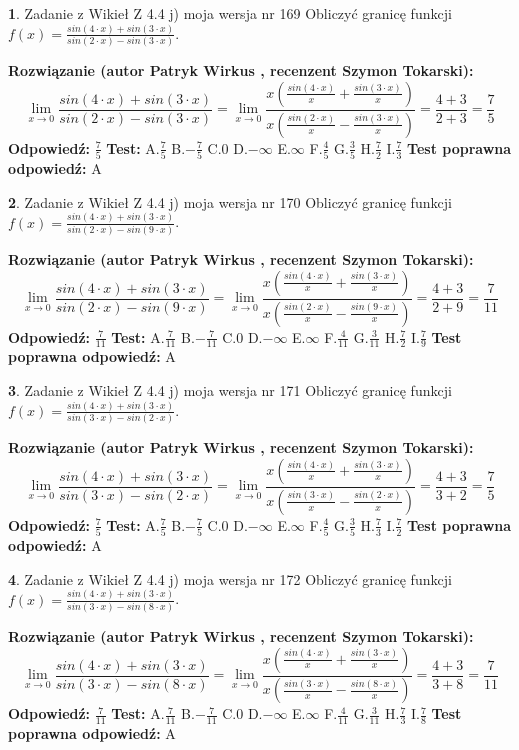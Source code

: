 \documentclass[12pt, a4paper]{article}
\theoremstyle{definition} %
\newtheorem{zad}{}
\newcommand{\zadStart}[1]{\begin{zad}#1\newline}
\newcommand{\zadStop}{\end{zad}}
\newcommand{\rozwStart}[2]{\noindent \textbf{Rozwiązanie (autor #1 , recenzent #2): }\newline}
\newcommand{\rozwStop}{\newline}
\newcommand{\odpStart}{\noindent \textbf{Odpowiedź:}\newline}
\newcommand{\odpStop}{\newline}
\newcommand{\testStart}{\noindent \textbf{Test:}\newline}
\newcommand{\testStop}{\newline}
\newcommand{\kluczStart}{\noindent \textbf{Test poprawna odpowiedź:}\newline}
\newcommand{\kluczStop}{\newline}
\begin{document}
\zadStart{Zadanie z Wikieł Z 4.4 j) moja wersja nr 169}
Obliczyć granicę funkcji $f(x)=\frac{sin(4\cdot x) +sin(3\cdot x)}{sin(2\cdot x) -sin(3\cdot x)}$.
\zadStop
\rozwStart{Patryk Wirkus}{Szymon Tokarski}
$$\lim\limits_{x\to 0}\frac{sin(4\cdot x) +sin(3\cdot x)}{sin(2\cdot x) -sin(3\cdot x)}=\lim\limits_{x\to 0}\frac{x(\frac{sin(4\cdot x)}{x}+\frac{sin(3\cdot x)}{x})}{x(\frac{sin(2\cdot x)}{x}-\frac{sin(3\cdot x)}{x})}=\frac{4+3}{2+3} = \frac{7}{5}$$
\rozwStop
\odpStart
$\frac{7}{5}$
\odpStop
\testStart
A.$\frac{7}{5}$
B.$-\frac{7}{5}$
C.$0$
D.$-\infty$
E.$\infty$
F.$\frac{4}{5}$
G.$\frac{3}{5}$
H.$\frac{7}{2}$
I.$\frac{7}{3}$
\testStop
\kluczStart
A
\kluczStop



\zadStart{Zadanie z Wikieł Z 4.4 j) moja wersja nr 170}
Obliczyć granicę funkcji $f(x)=\frac{sin(4\cdot x) +sin(3\cdot x)}{sin(2\cdot x) -sin(9\cdot x)}$.
\zadStop
\rozwStart{Patryk Wirkus}{Szymon Tokarski}
$$\lim\limits_{x\to 0}\frac{sin(4\cdot x) +sin(3\cdot x)}{sin(2\cdot x) -sin(9\cdot x)}=\lim\limits_{x\to 0}\frac{x(\frac{sin(4\cdot x)}{x}+\frac{sin(3\cdot x)}{x})}{x(\frac{sin(2\cdot x)}{x}-\frac{sin(9\cdot x)}{x})}=\frac{4+3}{2+9} = \frac{7}{11}$$
\rozwStop
\odpStart
$\frac{7}{11}$
\odpStop
\testStart
A.$\frac{7}{11}$
B.$-\frac{7}{11}$
C.$0$
D.$-\infty$
E.$\infty$
F.$\frac{4}{11}$
G.$\frac{3}{11}$
H.$\frac{7}{2}$
I.$\frac{7}{9}$
\testStop
\kluczStart
A
\kluczStop



\zadStart{Zadanie z Wikieł Z 4.4 j) moja wersja nr 171}
Obliczyć granicę funkcji $f(x)=\frac{sin(4\cdot x) +sin(3\cdot x)}{sin(3\cdot x) -sin(2\cdot x)}$.
\zadStop
\rozwStart{Patryk Wirkus}{Szymon Tokarski}
$$\lim\limits_{x\to 0}\frac{sin(4\cdot x) +sin(3\cdot x)}{sin(3\cdot x) -sin(2\cdot x)}=\lim\limits_{x\to 0}\frac{x(\frac{sin(4\cdot x)}{x}+\frac{sin(3\cdot x)}{x})}{x(\frac{sin(3\cdot x)}{x}-\frac{sin(2\cdot x)}{x})}=\frac{4+3}{3+2} = \frac{7}{5}$$
\rozwStop
\odpStart
$\frac{7}{5}$
\odpStop
\testStart
A.$\frac{7}{5}$
B.$-\frac{7}{5}$
C.$0$
D.$-\infty$
E.$\infty$
F.$\frac{4}{5}$
G.$\frac{3}{5}$
H.$\frac{7}{3}$
I.$\frac{7}{2}$
\testStop
\kluczStart
A
\kluczStop



\zadStart{Zadanie z Wikieł Z 4.4 j) moja wersja nr 172}
Obliczyć granicę funkcji $f(x)=\frac{sin(4\cdot x) +sin(3\cdot x)}{sin(3\cdot x) -sin(8\cdot x)}$.
\zadStop
\rozwStart{Patryk Wirkus}{Szymon Tokarski}
$$\lim\limits_{x\to 0}\frac{sin(4\cdot x) +sin(3\cdot x)}{sin(3\cdot x) -sin(8\cdot x)}=\lim\limits_{x\to 0}\frac{x(\frac{sin(4\cdot x)}{x}+\frac{sin(3\cdot x)}{x})}{x(\frac{sin(3\cdot x)}{x}-\frac{sin(8\cdot x)}{x})}=\frac{4+3}{3+8} = \frac{7}{11}$$
\rozwStop
\odpStart
$\frac{7}{11}$
\odpStop
\testStart
A.$\frac{7}{11}$
B.$-\frac{7}{11}$
C.$0$
D.$-\infty$
E.$\infty$
F.$\frac{4}{11}$
G.$\frac{3}{11}$
H.$\frac{7}{3}$
I.$\frac{7}{8}$
\testStop
\kluczStart
A
\kluczStop
\end{document}
